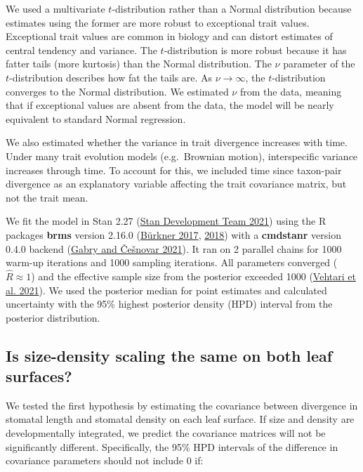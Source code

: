 \documentclass[
  10pt,
]{article}
\begin{document}
We used a multivariate \(t\)-distribution rather than a Normal distribution because estimates using the former are more robust to exceptional trait values. Exceptional trait values are common in biology and can distort estimates of central tendency and variance. The \(t\)-distribution is more robust because it has fatter tails (more kurtosis) than the Normal distribution. The \(\nu\) parameter of the \(t\)-distribution describes how fat the tails are. As \(\nu \to \infty\), the \(t\)-distribution converges to the Normal distribution. We estimated \(\nu\) from the data, meaning that if exceptional values are absent from the data, the model will be nearly equivalent to standard Normal regression.

We also estimated whether the variance in trait divergence increases with time. Under many trait evolution models (e.g.~Brownian motion), interspecific variance increases through time. To account for this, we included time since taxon-pair divergence as an explanatory variable affecting the trait covariance matrix, but not the trait mean.

We fit the model in Stan 2.27 (\protect\hyperlink{ref-stan_development_team_stan_2021}{Stan Development Team 2021}) using the R packages \textbf{brms} version 2.16.0 (\protect\hyperlink{ref-burkner_brms_2017}{Bürkner 2017}, \protect\hyperlink{ref-burkner_advanced_2018}{2018}) with a \textbf{cmdstanr} version 0.4.0 backend (\protect\hyperlink{ref-gabry_cmdstanr_2021}{Gabry and Češnovar 2021}). It ran on 2 parallel chains for 1000 warm-up iterations and 1000 sampling iterations. All parameters converged (\(\hat{R} \approx 1\)) and the effective sample size from the posterior exceeded 1000 (\protect\hyperlink{ref-vehtari_rank-normalization_2021}{Vehtari et al. 2021}). We used the posterior median for point estimates and calculated uncertainty with the 95\% highest posterior density (HPD) interval from the posterior distribution.

\hypertarget{is-size-density-scaling-the-same-on-both-leaf-surfaces}{%
\subsection{Is size-density scaling the same on both leaf surfaces?}\label{is-size-density-scaling-the-same-on-both-leaf-surfaces}}

We tested the first hypothesis by estimating the covariance between divergence in stomatal length and stomatal density on each leaf surface. If size and density are developmentally integrated, we predict the covariance matrices will not be significantly different. Specifically, the 95\% HPD intervals of the difference in covariance parameters should not include 0 if:
\end{document}
